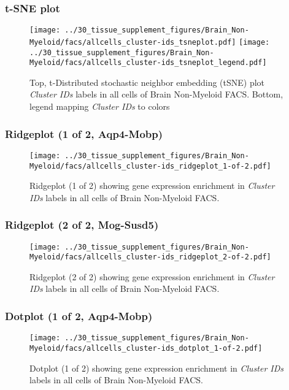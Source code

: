 \clearpage
\subsubsection{t-SNE plot}
\begin{figure}[h]
\centering
\texttt{[image: ../30\_tissue\_supplement\_figures/Brain\_Non-Myeloid/facs/allcells\_cluster-ids\_tsneplot.pdf]}
\texttt{[image: ../30\_tissue\_supplement\_figures/Brain\_Non-Myeloid/facs/allcells\_cluster-ids\_tsneplot\_legend.pdf]}
\caption{Top, t-Distributed stochastic neighbor embedding (tSNE) plot  \emph{Cluster IDs} labels in all cells of Brain Non-Myeloid FACS. Bottom, legend mapping \emph{Cluster IDs} to colors}
\end{figure}


\clearpage

\subsubsection{Ridgeplot (1 of 2, Aqp4-Mobp)}
\begin{figure}[h]
\centering
\texttt{[image: ../30\_tissue\_supplement\_figures/Brain\_Non-Myeloid/facs/allcells\_cluster-ids\_ridgeplot\_1-of-2.pdf]}

\caption{ Ridgeplot (1 of 2)  showing gene expression enrichment in \emph{Cluster IDs} labels in all cells of Brain Non-Myeloid FACS. }
\end{figure}


\clearpage

\subsubsection{Ridgeplot (2 of 2, Mog-Susd5)}
\begin{figure}[h]
\centering
\texttt{[image: ../30\_tissue\_supplement\_figures/Brain\_Non-Myeloid/facs/allcells\_cluster-ids\_ridgeplot\_2-of-2.pdf]}

\caption{ Ridgeplot (2 of 2)  showing gene expression enrichment in \emph{Cluster IDs} labels in all cells of Brain Non-Myeloid FACS. }
\end{figure}


\clearpage

\subsubsection{Dotplot (1 of 2, Aqp4-Mobp)}
\begin{figure}[h]
\centering
\texttt{[image: ../30\_tissue\_supplement\_figures/Brain\_Non-Myeloid/facs/allcells\_cluster-ids\_dotplot\_1-of-2.pdf]}

\caption{ Dotplot (1 of 2)  showing gene expression enrichment in \emph{Cluster IDs} labels in all cells of Brain Non-Myeloid FACS. }
\end{figure}



